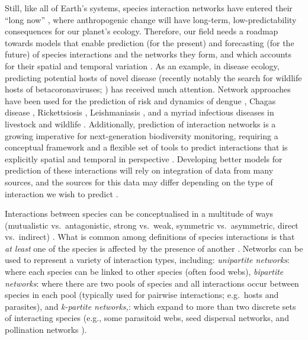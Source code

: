 Still, like all of Earth's systems, species interaction networks have
entered their ``long now'' \cite{Carpenter2002EcoFut}, where
anthropogenic change will have long-term, low-predictability
consequences \cite{Burkle2013PlaInt} for our planet's ecology.
Therefore, our field needs a roadmap towards models that enable
prediction (for the present) and forecasting (for the future) of species
interactions and the networks they form, and which accounts for their
spatial and temporal variation \cite{McCann2007ProBio, Seibold2018NecMul}. 
As an example, in disease ecology, predicting
potential hosts of novel disease (recently notably the search for
wildlife hosts of betacoronaviruses; \cite{Becker2020PreWil,
Wardeh2021PreMam}) has received much attention. Network approaches
have been used for the prediction of risk and dynamics of dengue
\cite{Zhao2020MacLea}, Chagas disease \cite{Rengifo-Correa2017UndTra},
Rickettsiosis \cite{Morand2020DisEco}, Leishmaniasis
\cite{Stephens2009UsiBio}, and a myriad infectious diseases in livestock
and wildlife \cite{Craft2015InfDis}. Additionally, prediction of
interaction networks is a growing imperative for next-generation
biodiversity monitoring, requiring a conceptual framework and a flexible
set of tools to predict interactions that is explicitly spatial and
temporal in perspective \cite{Edwards2021TroLan, Magioli2021DefLea,
Zhang2021PlaBre}. Developing better models for prediction of these
interactions will rely on integration of data from many sources, and the
sources for this data may differ depending on the type of interaction we
wish to predict \cite{Gibb2021DatPro}.

Interactions between species can be conceptualised in a multitude of
ways (mutualistic vs.~antagonistic, strong vs.~weak, symmetric
vs.~asymmetric, direct vs.~indirect) \cite{Jordano2016ChaEco,
Morales-Castilla2015InfBio}. What is common among definitions of
species interactions is that \emph{at least} one of the species is
affected by the presence of another \cite{Morales-Castilla2015InfBio}.
Networks can be used to represent a variety of interaction types,
including: \emph{unipartite networks}: where each species can be linked
to other species (often food webs), \emph{bipartite networks}: where
there are two pools of species and all interactions occur between
species in each pool (typically used for pairwise interactions;
e.g.~hosts and parasites), and \emph{k-partite networks,}: which expand
to more than two discrete sets of interacting species (e.g., some
parasitoid webs, seed dispersal networks, and pollination networks
\cite{Pocock2012RobRes}).

